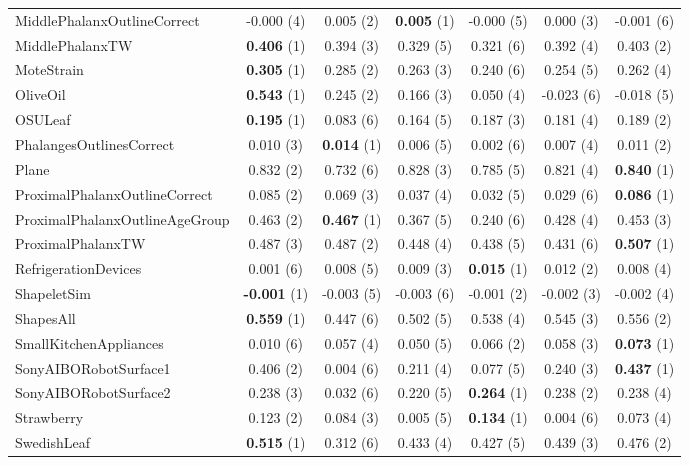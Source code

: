 \begin{table}[ht]
\begin{adjustbox}{width=\textwidth}
\begin{tabular}{lcccccc}
    MiddlePhalanxOutlineCorrect & -0.000 (4) & 0.005 (2) & \textbf{0.005} (1) & -0.000 (5) & 0.000 (3) & -0.001 (6) \\
    MiddlePhalanxTW & \textbf{0.406} (1) & 0.394 (3) & 0.329 (5) & 0.321 (6) & 0.392 (4) & 0.403 (2) \\
    MoteStrain & \textbf{0.305} (1) & 0.285 (2) & 0.263 (3) & 0.240 (6) & 0.254 (5) & 0.262 (4) \\
    OliveOil & \textbf{0.543} (1) & 0.245 (2) & 0.166 (3) & 0.050 (4) & -0.023 (6) & -0.018 (5) \\
    OSULeaf & \textbf{0.195} (1) & 0.083 (6) & 0.164 (5) & 0.187 (3) & 0.181 (4) & 0.189 (2) \\
    PhalangesOutlinesCorrect & 0.010 (3) & \textbf{0.014} (1) & 0.006 (5) & 0.002 (6) & 0.007 (4) & 0.011 (2) \\
    Plane & 0.832 (2) & 0.732 (6) & 0.828 (3) & 0.785 (5) & 0.821 (4) & \textbf{0.840} (1) \\
    ProximalPhalanxOutlineCorrect & 0.085 (2) & 0.069 (3) & 0.037 (4) & 0.032 (5) & 0.029 (6) & \textbf{0.086} (1) \\
    ProximalPhalanxOutlineAgeGroup & 0.463 (2) & \textbf{0.467} (1) & 0.367 (5) & 0.240 (6) & 0.428 (4) & 0.453 (3) \\
    ProximalPhalanxTW & 0.487 (3) & 0.487 (2) & 0.448 (4) & 0.438 (5) & 0.431 (6) & \textbf{0.507} (1) \\
    RefrigerationDevices & 0.001 (6) & 0.008 (5) & 0.009 (3) & \textbf{0.015} (1) & 0.012 (2) & 0.008 (4) \\
    ShapeletSim & \textbf{-0.001} (1) & -0.003 (5) & -0.003 (6) & -0.001 (2) & -0.002 (3) & -0.002 (4) \\
    ShapesAll & \textbf{0.559} (1) & 0.447 (6) & 0.502 (5) & 0.538 (4) & 0.545 (3) & 0.556 (2) \\
    SmallKitchenAppliances & 0.010 (6) & 0.057 (4) & 0.050 (5) & 0.066 (2) & 0.058 (3) & \textbf{0.073} (1) \\
    SonyAIBORobotSurface1 & 0.406 (2) & 0.004 (6) & 0.211 (4) & 0.077 (5) & 0.240 (3) & \textbf{0.437} (1) \\
    SonyAIBORobotSurface2 & 0.238 (3) & 0.032 (6) & 0.220 (5) & \textbf{0.264} (1) & 0.238 (2) & 0.238 (4) \\
    Strawberry & 0.123 (2) & 0.084 (3) & 0.005 (5) & \textbf{0.134} (1) & 0.004 (6) & 0.073 (4) \\
    SwedishLeaf & \textbf{0.515} (1) & 0.312 (6) & 0.433 (4) & 0.427 (5) & 0.439 (3) & 0.476 (2) \\

\end{tabular}
\end{adjustbox}
\end{table}
